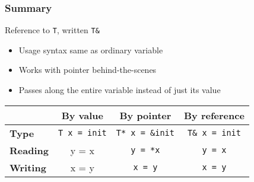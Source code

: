 \documentclass{../ucll-slides}
\begin{document}
\begin{frame}
  \frametitle{Summary}
  \begin{center}
    \Large Reference to {\tt T}, written {\tt T\&}
  \end{center}
  \begin{itemize}
    \item Usage syntax same as ordinary variable
    \item Works with pointer behind-the-scenes
    \item Passes along the entire variable instead of just its value
  \end{itemize}
  \vskip5mm
  \begin{center}
    \begin{tabular}{lccc}
      & \textbf{By value} & \textbf{By pointer} & \textbf{By reference} \\
      \toprule
      \textbf{Type} & {\tt T x = init} & {\tt T* x = \&init} & {\tt T\& x = init} \\
      \textbf{Reading} & {y = x} & {\tt y = *x} & {\tt y = x} \\
      \textbf{Writing} & {x = y} & {\tt *x = y} & {\tt x = y} \\
    \end{tabular}
  \end{center}
\end{frame}
\end{document}
